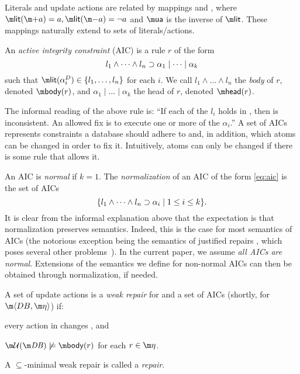Literals and update actions are related by mappings \litof and \actof, where $\litof(\add a)= a, \litof(\remove a) = \lnot a$ and $\actof$ is the inverse of $\litof$.
These mappings naturally extend to sets of literals/actions. 

\begin{definition}
 An \emph{active integrity constraint} (AIC) is a rule $r$ of the form
  \begin{equation} l_1\land \dots\land l_n\supset \alpha_1\mid\dots \mid \alpha_k \label{eq:aic}\end{equation}
  such that $\litof(\alpha_i^D) \in \{l_1,\dots,l_n\}$ for each $i$.
%  
  We call $l_1\land \dots \land l_n$ the \emph{body} of $r$, denoted $\body(r)$, and $\alpha_1\mid\dots \mid \alpha_k$ the head of $r$, denoted $\head (r)$.
\end{definition}

The informal reading of the above rule is: ``If each of the $l_i$ holds in \db, then \db is inconsistent. An allowed fix is to execute one or more of the $\alpha_i$.''
A set of AICs represents constraints a database should adhere to and, in addition, which atoms can be changed in order to fix it. Intuitively, atoms can only be changed if there is some rule that allows it. 


An AIC is \emph{normal} if $k=1$. The \emph{normalization} of an AIC of the form \eqref{eq:aic} is the set of AICs 
\[\{l_1\land \dots\land l_n\supset \alpha_i\mid 1\leq i\leq k\}.\]
It is clear from the informal explanation above that the expectation is that normalization preserves semantics. Indeed, this is the case for most semantics of AICs (the notorious exception being the semantics of justified repairs \cite{tplp/CaropreseT11}, which poses several other problems~\cite{tase/Cruz-FilipeEGN13}).
In the current paper, we assume \emph{all AICs are normal}. Extensions of the semantics we define for non-normal AICs can then be obtained through normalization, if needed.

\begin{definition}
 A set of update actions \UU is a \emph{weak repair} for \db and a set \aics of AICs (shortly, for $\fulldb$) if:
 \begin{compactitem}
  \item every action in \UU changes \db, and 
  \item $\UU(\db)\not\models \body(r)$ for each $r\in\aics$.
 \end{compactitem}
A $\subseteq$-minimal weak repair is called a \emph{repair}.
\end{definition}

